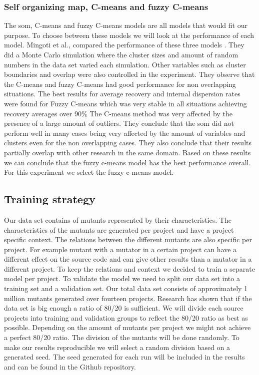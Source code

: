\documentclass[../../main]{subfiles}
\begin{document}
\subsubsection{Self organizing map, C-means and fuzzy C-means}
\label{ch:topThreeModels}
The \acrfull{som}, C-means and fuzzy C-means models are all models that would fit our purpose. 
To choose between these models we will look at the performance of each model.
Mingoti et al., compared the performance of these three models \cite{Mingoti2006ComparingAlgorithms}.
They did a Monte Carlo simulation where the cluster sizes and amount of random numbers in the data set varied each simulation\cite{Mingoti2006ComparingAlgorithms}.
Other variables such as cluster boundaries and overlap were also controlled in the experiment.
They observe that the C-means and fuzzy C-means had good performance for non overlapping situations\cite{Mingoti2006ComparingAlgorithms}.
The best results for average recovery and internal dispersion rates were found for Fuzzy C-means which was very stable in all situations achieving recovery averages over 90\%\cite{Mingoti2006ComparingAlgorithms}
The C-means method was very affected by the presence of a large amount of outliers.
They conclude that the \acrshort{som} did not perform well in many cases being very affected by the amount of variables and clusters even for the non overlapping cases\cite{Mingoti2006ComparingAlgorithms}.
They also conclude that their results partially overlap with other research in the same domain.
\newline
Based on these results we can conclude that the fuzzy c-means model has the best performance overall.
For this experiment we select the fuzzy c-means model.

\subsection{Training strategy}
\label{ch:training_strategy}
Our data set contains of mutants represented by their characteristics. 
The characteristics of the mutants are generated per project and have a project specific context.
The relations between the different mutants are also specific per project.
For example mutant with a mutator in a certain project can have a different effect on the source code and can give other results than a mutator in a different project.
To keep the relations and context we decided to train a separate model per project.
\newline
To validate the model we need to split our data set into a training set and a validation set.
Our total data set consists of approximately 1 million mutants generated over fourteen projects.
Research has shown that if the data set is big enough a ratio of 80/20 is sufficient\cite{Guyon1997ARatio}.
We will divide each source projects into training and validation groups to reflect the 80/20 ratio as best as possible.
Depending on the amount of mutants per project we might not achieve a perfect 80/20 ratio.
The division of the mutants will be done randomly. 
To make our results reproducible we will select a random division based on a generated seed.
The seed generated for each run will be included in the results and can be found in the Github repository\cite{rbasarat-repo}.
\end{document}
